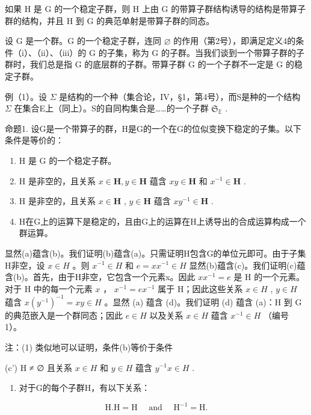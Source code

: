 如果 H 是 G 的一个稳定子群，则 H 上由 G 的带算子群结构诱导的结构是带算子群的结构，并且 H 到 G 的典范单射是带算子群的同态。

设 G 是一个群。G 的一个稳定子群，连同 \(\varnothing\) 的作用（第2号），即满足定义4的条件（i）、（ii）、（iii）的 G 的子集，称为 G 的子群。当我们谈到一个带算子群的子群时，我们总是指 G 的底层群的子群。带算子群 G 的一个子群不一定是 G 的稳定子群。

例（1）。设 \(\Sigma\) 是结构的一个种（集合论，IV，§1，第4号），而S是种的一个结构 \(\Sigma\) 在集合E上（同上）。S的自同构集合是……的一个子群 \(\mathfrak{S}_{\mathbb{E}}\) .

命题1. 设G是一个带算子的群，H是G的一个在G的位似变换下稳定的子集。以下条件是等价的：

\begin{enumerate}
\def\labelenumi{(\alph{enumi})}
\item
  H 是 G 的一个稳定子群。
\item
  H 是非空的，且关系 \(x \in \mathbf{H}, y \in \mathbf{H}\) 蕴含 \(xy \in \mathbf{H}\) 和 \(x^{-1} \in \mathbf{H}\) .
\item
  H 是非空的，且关系 \(x \in \mathbf{H}\) , \(y \in \mathbf{H}\) 蕴含 \(xy^{-1} \in \mathbf{H}\) .
\item
  H在G上的运算下是稳定的，且由G上的运算在H上诱导出的合成运算构成一个群运算。
\end{enumerate}

显然(a)蕴含(b)。我们证明(b)蕴含(a)。只需证明H包含G的单位元即可。由于子集H非空，设 \(x \in H\) 。则 \(x^{-1} \in H\) 和 \(e = xx^{-1} \in H\) 显然(b)蕴含(c)。我们证明(c)蕴含(b)。首先，由于H非空，它包含一个元素x。因此 \(xx^{-1} = e\) 是 H 的一个元素。对于 H 中的每一个元素 \(x\) ， \(x^{-1} = ex^{-1}\) 属于 H；因此这些关系 \(x \in H\) , \(y \in H\) 蕴含 \(x(y^{-1})^{-1} = xy \in H\) 。显然 (a) 蕴含 (d)。我们证明 (d) 蕴含 (a)：H 到 G 的典范嵌入是一个群同态；因此 \(e \in H\) 以及关系 \(x \in H\) 蕴含 \(x^{-1} \in H\) （编号 1）。

注：(1) 类似地可以证明，条件(b)等价于条件

(c') H ≠ ∅ 且关系 \(x \in H\) 和 \(y \in H\) 蕴含 \(y^{-1}x \in H\) .

\begin{enumerate}
\def\labelenumi{(\arabic{enumi})}
\setcounter{enumi}{1}
\tightlist
\item
  对于G的每个子群H，有以下关系：
\end{enumerate}

\[
\mathrm{H.H} = \mathrm{H} \quad \text { and } \quad \mathrm{H} ^ {- 1} = \mathrm{H}.\tag{1}
\]

